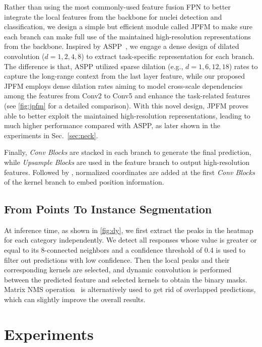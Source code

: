 \documentclass[lettersize,journal]{IEEEtran}
\begin{document}
Rather than using the most commonly-used feature fusion FPN to better integrate the local features from the backbone for nuclei detection and classification, we design a simple but efficient module called JPFM to make sure each branch can make full use of the maintained high-resolution representations from the backbone. Inspired by ASPP~\cite{chen2017deeplab}, we engage a dense design of dilated convolution ($d=1, 2, 4, 8$) to extract task-specific representation for each branch. The difference is that, ASPP utilized sparse dilation (e.g., $d=1, 6, 12, 18$) rates to capture the long-range context from the last layer feature, while our proposed JPFM employs dense dilation rates aiming to model cross-scale dependencies among the features from Conv2 to Conv5 and enhance the task-related features (see \autoref{fig:jpfm} for a detailed comparison). With this novel design, JPFM proves able to  better exploit the maintained high-resolution representations, leading to much higher performance compared with ASPP, as later shown in the experiments in Sec.~\ref{sec:neck}.

Finally, \textit{Conv Blocks} are stacked in each branch to generate the final prediction, while \textit{Upsample Blocks} are used in the feature branch to output high-resolution features. Followed by \cite{solov2}, normalized coordinates are added at the first \textit{Conv Blocks} of the kernel branch to embed position information.

\subsection{From Points To Instance Segmentation}
At inference time, as shown in \autoref{fig:dy}, we first extract the peaks in the heatmap for each category independently. We detect all responses whose value is greater or equal to its 8-connected neighbors and a confidence threshold of 0.4 is used to filter out predictions with low confidence. Then the local peaks and their corresponding kernels are selected, and dynamic convolution is performed between the predicted feature and selected kernels to obtain the binary masks. Matrix NMS operation~\cite{solov2} is alternatively used to get rid of overlapped predictions, which can slightly improve the overall results.






\section{Experiments}
\end{document}
